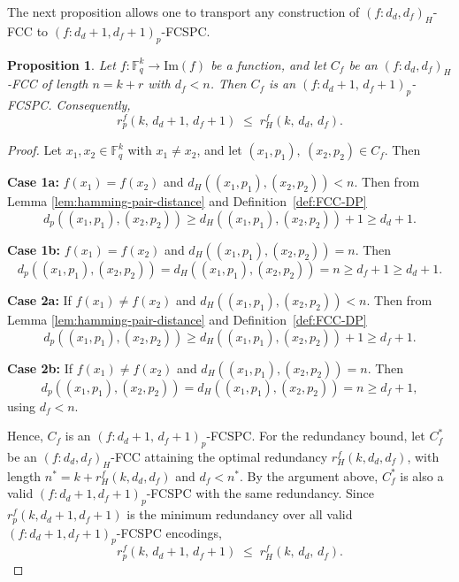 \documentclass[11pt,draftclsnofoot,journal,onecolumn]{IEEEtran}
\newtheorem{proposition}{Proposition}
\begin{document}

    The next proposition allows one to transport any construction of $(f: d_d, d_f)_H$-FCC to $(f: d_d+1, d_f+1)_p$-FCSPC.
    \begin{proposition}
    \label{prop:hamming_symbol_red_up}
    Let $f : \mathbb{F}_q^k \to \mathrm{Im}(f)$ be a function, and let $C_f$ be an $(f : d_d, d_f)_H$-FCC of length $n = k+r$ with $d_f < n$. Then $C_f$ is an $(f : d_d+1,\, d_f+1)_p$-FCSPC. Consequently,
    \[
        r_p^f(k,\, d_d+1,\, d_f+1) \;\leq\; r_H^f(k,\, d_d,\, d_f).
    \]
    \end{proposition}
    
    \begin{proof}
        Let $x_1, x_2 \in \mathbb{F}_q^k$ with $x_1 \neq x_2$, and let $(x_1,p_1), \ (x_2,p_2) \in C_f$. Then
        
        \noindent \textbf{Case 1a: } $f(x_1) = f(x_2)$ and $d_H((x_1,p_1), (x_2,p_2)) < n$. Then from Lemma \ref{lem:hamming-pair-distance} and Definition~\ref{def:FCC-DP}
        \[
        d_p((x_1,p_1), (x_2,p_2)) \geq d_H((x_1,p_1), (x_2,p_2))+ 1 \geq d_d+1.
        \]

        \noindent \textbf{Case 1b: }
         $f(x_1) = f(x_2)$ and $d_H((x_1,p_1), (x_2,p_2)) = n$. Then $$d_p((x_1,p_1), (x_2,p_2)) = d_H((x_1,p_1), (x_2,p_2)) = n \geq d_f + 1 \geq d_d +1.$$

        \noindent \textbf{Case 2a: }
        If $f(x_1) \neq f(x_2)$ and $d_H((x_1,p_1), (x_2,p_2)) < n$. Then from Lemma \ref{lem:hamming-pair-distance} and Definition~\ref{def:FCC-DP}
        \[
        d_p((x_1,p_1), (x_2,p_2)) \geq d_H((x_1,p_1), (x_2,p_2))+ 1 \geq d_f+1.
        \]

        \noindent \textbf{Case 2b: }
        If $f(x_1) \neq f(x_2)$ and $d_H((x_1,p_1), (x_2,p_2)) = n$. Then $$d_p((x_1,p_1), (x_2,p_2)) = d_H((x_1,p_1), (x_2,p_2)) = n \geq d_f +1,$$ using $d_f < n$.

        Hence, $C_f$ is an $(f : d_d+1,\, d_f+1)_p$-FCSPC. 
        For the redundancy bound, let $C_f^*$ be an $(f:d_d,d_f)_H$-FCC attaining the optimal redundancy $r_H^f(k,d_d,d_f)$, with length $n^* = k + r_H^f(k,d_d,d_f)$ and $d_f < n^*$. By the argument above, $C_f^*$ is also a valid $(f:d_d+1,d_f+1)_p$-FCSPC with the same redundancy. Since $r_p^f(k,d_d+1,d_f+1)$ is the minimum redundancy over all valid $(f:d_d+1,d_f+1)_p$-FCSPC encodings,
        \[
        r_p^f(k,\,d_d+1,\,d_f+1) \;\leq\; r_H^f(k,\,d_d,\,d_f). 
        \]
    \end{proof}
\end{document}
